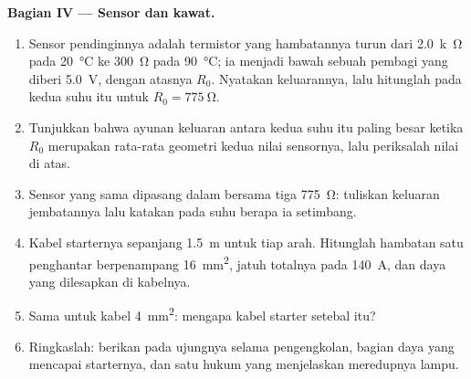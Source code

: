 \begin{problem}
\medskip
\noindent\textbf{Bagian IV --- Sensor dan kawat.}
\begin{enumerate}[resume]
  \item Sensor pendinginnya adalah termistor yang hambatannya turun dari
        \qty{2.0}{k\ohm} pada \qty{20}{\degreeCelsius} ke \qty{300}{\ohm} pada
        \qty{90}{\degreeCelsius}; ia menjadi  bawah sebuah pembagi
        yang diberi \qty{5.0}{V}, dengan  atasnya $R_0$. Nyatakan
         keluarannya, lalu hitunglah pada kedua suhu itu untuk
        $R_0 = \qty{775}{\ohm}$.
  \item Tunjukkan bahwa ayunan keluaran antara kedua suhu itu paling
        besar ketika $R_0$ merupakan rata-rata geometri kedua nilai
        sensornya, lalu periksalah nilai di atas.
  \item Sensor yang sama dipasang dalam  bersama tiga
         \qty{775}{\ohm}: tuliskan keluaran jembatannya lalu
        katakan pada suhu berapa ia setimbang.
  \item Kabel starternya sepanjang \qty{1.5}{m} untuk tiap arah.
        Hitunglah hambatan satu penghantar berpenampang \qty{16}{mm^2},
        jatuh  totalnya pada \qty{140}{A}, dan daya yang
        dilesapkan di kabelnya.
  \item Sama untuk kabel \qty{4}{mm^2}: mengapa kabel starter setebal itu?
  \item Ringkaslah: berikan  pada ujungnya selama pengengkolan,
        bagian daya yang mencapai starternya, dan satu hukum yang
        menjelaskan meredupnya lampu.
\end{enumerate}
\end{problem}
